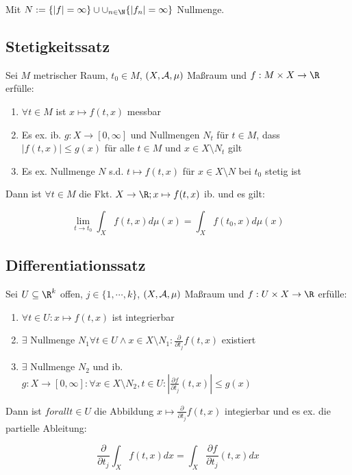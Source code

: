 Mit $N := \{|f| = \infty\} \cup \cup_{n \in \N} \{|f_n| = \infty\}$ Nullmenge.

\subsection*{Stetigkeitssatz}

Sei $M$ metrischer Raum, $t_0 \in M$, $(X,\mathcal{A},\mu)$ Maßraum und $f : M \times X \to \R$ erfülle:

\begin{enumerate}[label=(\alph*)]
	\item $\forall t \in M$ ist $x \mapsto f(t,x)$ messbar
	\item Es ex. ib. $g : X \to [0,\infty]$ und Nullmengen $N_t$ für $t \in M$, dass $|f(t,x)| \leq g(x)$ für alle $t \in M$ und $x \in X \setminus N_t$ gilt
	\item Es ex. Nullmenge $N$ s.d. $t \mapsto f(t,x)$ für $x \in X \setminus N$ bei $t_0$ stetig ist
\end{enumerate}

Dann ist $\forall t \in M$ die Fkt. $X \to \R; x \mapsto f(t,x)$ ib. und es gilt:

\vspace{-2mm}
$$\lim_{t \to t_0} \int_X f(t,x) d\mu(x) = \int_X f(t_0,x) d\mu(x)$$

\subsection*{Differentiationssatz}

Sei $U \subseteq \R^k$ offen, $j \in \{1,\cdots,k\}$, $(X,\mathcal{A},\mu)$ Maßraum und $f : U \times X \to \R$ erfülle:

\begin{enumerate}[label=(\alph*)]
	\item $\forall t \in U : x \mapsto f(t,x)$ ist integrierbar
	\item $\exists$ Nullmenge $N_1 \forall t \in U \land x \in X \setminus N_1 : \frac{\partial}{\partial t_j} f(t,x)$ existiert
	\item $\exists$ Nullmenge $N_2$ und ib. $g : X \to [0,\infty] : \forall x \in X \setminus N_2, t \in U : |\frac{\partial f}{\partial t_j} (t,x)| \leq g(x)$
\end{enumerate}

Dann ist $forall t \in U$ die Abbildung $x \mapsto \frac{\partial}{\partial t_j} f(t,x)$ integierbar und es ex. die partielle Ableitung:

$$\frac{\partial}{\partial t_j} \int_X f(t,x) dx = \int_X \frac{\partial f}{\partial t_j} (t,x) dx$$

